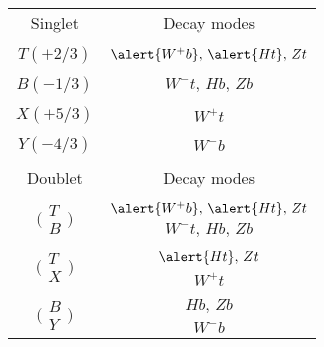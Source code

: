 \begin{tabular}{cc}\toprule
Singlet & Decay modes\\ 
& \\
$T(+2/3)$ & $\alert{ W^+b},\, \alert{ Ht},\, Zt$ \\
& \\
$B(-1/3)$ & $ W^-t,\, Hb,\, Zb$ \\
& \\
$X(+5/3)$ & $W^+t$\\
& \\
$Y(-4/3)$ & \alert{$W^-b$} \\
& \\\midrule
Doublet & Decay modes\\
 &\\
 \multirow{2}{*}{$\bigg(\begin{array}{c}T \\ B\end{array}\bigg)$} & $\alert{ W^+b},\, \alert{ Ht},\, Zt$ \\
 & $ W^-t,\, Hb,\, Zb$\\
 & \\
\multirow{2}{*}{$\bigg(\begin{array}{c}T \\ X\end{array}\bigg)$} & $\alert{ Ht},\, Zt$\\
 & $W^+t$\\
 &\\
 \multirow{2}{*}{$\bigg(\begin{array}{c}B \\ Y\end{array}\bigg)$} & $Hb,\, Zb$\\
 & \alert{$W^-b$}\\
\bottomrule
\end{tabular}
